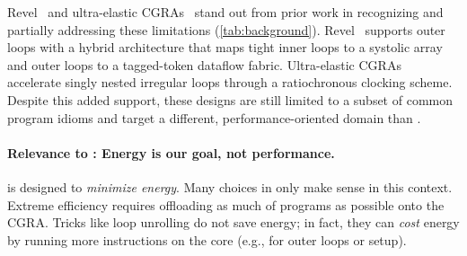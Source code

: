 
Revel~\cite{weng2020hybrid} and ultra-elastic CGRAs~\cite{torng2021ultra} stand out from prior work in recognizing and partially addressing these limitations (\autoref{tab:background}).
% 
Revel~\cite{weng2020hybrid} supports outer loops with a hybrid architecture that maps tight inner loops to a systolic array and outer loops to a tagged-token dataflow fabric.
% 
Ultra-elastic CGRAs~\cite{torng2021ultra} accelerate singly nested irregular loops through a ratiochronous clocking scheme.
% 
Despite this added support, these designs are still limited to a subset of common program idioms and target a different, performance-oriented domain than \riptide.
% 
% 



\paragraph{Relevance to \riptide: Energy is our goal, not performance.}
%
\riptide is designed to \emph{minimize energy}.
%
Many choices in \riptide only make sense in this context.
%
Extreme efficiency requires offloading as much of programs as possible onto the CGRA.
% 
%
Tricks like loop unrolling do not save energy; in fact, they
can \emph{cost} energy by running more instructions on the core
(e.g., for outer loops or setup).
%

